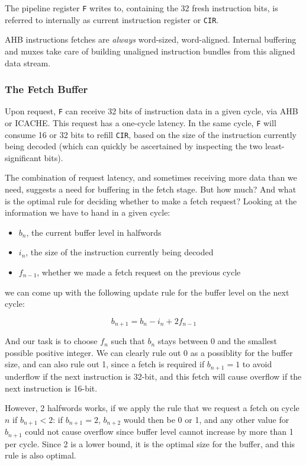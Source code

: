 \documentclass{article}
\begin{document}
The pipeline register \texttt{F} writes to, containing the 32 fresh instruction bits, is referred to internally as current instruction register or \texttt{CIR}.

AHB instructions fetches are \textit{always} word-sized, word-aligned. Internal buffering and muxes take care of building unaligned instruction bundles from this aligned data stream.

\subsubsection{The Fetch Buffer}
\label{section:fetch_buffer}

Upon request, \texttt{F} can receive 32 bits of instruction data in a given cycle, via AHB or ICACHE. This request has a one-cycle latency. In the same cycle, \texttt{F} will consume 16 or 32 bits to refill \texttt{CIR}, based on the size of the instruction currently being decoded (which can quickly be ascertained by inspecting the two least-significant bits).

The combination of request latency, and sometimes receiving more data than we need, suggests a need for buffering in the fetch stage. But how much? And what is the optimal rule for deciding whether to make a fetch request? Looking at the information we have to hand in a given cycle:

\begin{itemize}
	\item $b_n$, the current buffer level in halfwords
	\item $i_n$, the size of the instruction currently being decoded
	\item $f_{n-1}$, whether we made a fetch request on the previous cycle
\end{itemize}

we can come up with the following update rule for the buffer level on the next cycle:

\[ b_{n+1} = b_n - i_n + 2f_{n-1} \]

And our task is to choose $f_n$ such that $b_n$ stays between 0 and the smallest possible positive integer. We can clearly rule out 0 as a possiblity for the buffer size, and can also rule out 1, since a fetch is required if $b_{n+1} = 1$ to avoid underflow if the next instruction is 32-bit, and this fetch will cause overflow if the next instruction is 16-bit.

However, 2 halfwords works, if we apply the rule that we request a fetch on cycle $n$ if $b_{n+1} < 2$: if $b_{n+1} = 2$,  $b_{n+2}$ would then be 0 or 1, and any other value for $b_{n+1}$ could not cause overflow since buffer level cannot increase by more than 1 per cycle. Since 2 is a lower bound, it is the optimal size for the buffer, and this rule is also optimal.
\end{document}
